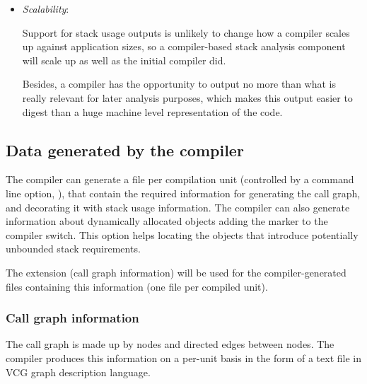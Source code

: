 \begin {itemize}
In both cases, the compiler information at hand is extremely hard, if not
impossible, to infer from a machine level representation.

\item {\it Scalability}:

Support for stack usage outputs is unlikely to change how a compiler scales up
against application sizes, so a compiler-based stack analysis component will
scale up as well as the initial compiler did.

Besides, a compiler has the opportunity to output no more than what is really
relevant for later analysis purposes, which makes this output easier to digest
than a huge machine level representation of the code.

\end{itemize}

\subsection{Data generated by the compiler}

The compiler can generate a file per compilation unit (controlled by a
command line option, ), that contain the
required information for generating the call graph, and decorating it
with stack usage information. The compiler can also generate
information about dynamically allocated objects adding the 
marker to the  compiler switch. This option
helps locating the objects that introduce potentially unbounded stack
requirements.

The extension  (call graph information) will be used for the
compiler-generated files containing this information (one file per
compiled unit).

\subsubsection{Call graph information}
\label{compiler-call-graph}

The call graph is made up by nodes and directed edges between
nodes. The compiler produces this information on a per-unit basis in
the form of a text file in VCG  graph description
language.

